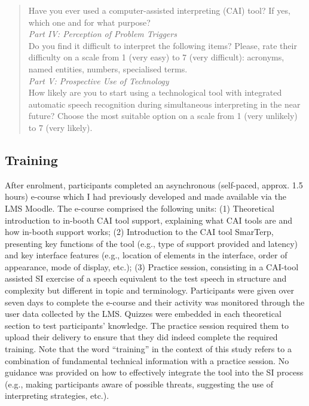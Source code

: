 \begin{quote}
Have you ever used a computer-assisted interpreting (CAI) tool? If yes, which one and for what purpose?\\

\textit{Part IV: Perception of Problem Triggers}\\

Do you find it difficult to interpret the following items? Please, rate their difficulty on a scale from 1 (very easy) to 7 (very difficult): acronyms, named entities, numbers, specialised terms.\\

\textit{Part V: Prospective Use of Technology}\\

How likely are you to start using a technological tool with integrated automatic speech recognition during simultaneous interpreting in the near future? Choose the most suitable option on a scale from 1 (very unlikely) to 7 (very likely).

\end{quote}



\subsection{Training}


After enrolment, participants completed an asynchronous (self-paced, approx. 1.5 hours) e-course which I had previously developed and made available via the LMS Moodle. The e-course comprised the following units: (1) Theoretical introduction to in-booth CAI tool support, explaining what CAI tools are and how in-booth support works; (2) Introduction to the CAI tool SmarTerp, presenting key functions of the tool (e.g., type of support provided and latency) and key interface features (e.g., location of elements in the interface, order of appearance, mode of display, etc.); (3) Practice session, consisting in a CAI-tool assisted SI exercise of a speech equivalent to the test speech in structure and complexity but different in topic and terminology. Participants were given over seven days to complete the e-course and their activity was monitored through the user data collected by the LMS. Quizzes were embedded in each theoretical section to test participants’ knowledge. The practice session required them to upload their delivery to ensure that they did indeed complete the required training. Note that the word ``training'' in the context of this study refers to a combination of fundamental technical information with a practice session. No guidance was provided on how to effectively integrate the tool into the SI process (e.g., making participants aware of possible threats, suggesting the use of interpreting strategies, etc.).



